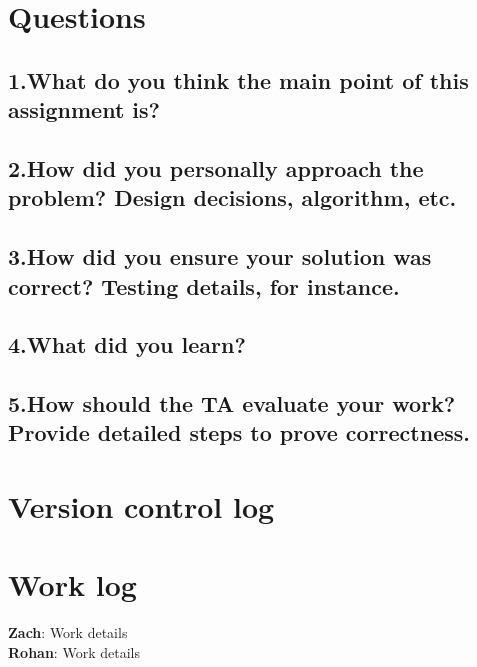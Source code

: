 \documentclass[letterpaper,10pt,fleqn]{article}
\begin{document}
	
	\section*{Questions}
	\subsection*{1.What do you think the main point of this assignment is?}
	\subsection*{2.How did you personally approach the problem? Design decisions, algorithm, etc.}
	\subsection*{3.How did you ensure your solution was correct? Testing details, for instance.}
	\subsection*{4.What did you learn?}
	\subsection*{5.How should the TA evaluate your work? Provide detailed steps to prove correctness.}

	\section*{Version control log}


	\section*{Work log}

	\textbf{Zach}: Work details
	\\\textbf{Rohan}: Work details
\end{document}
